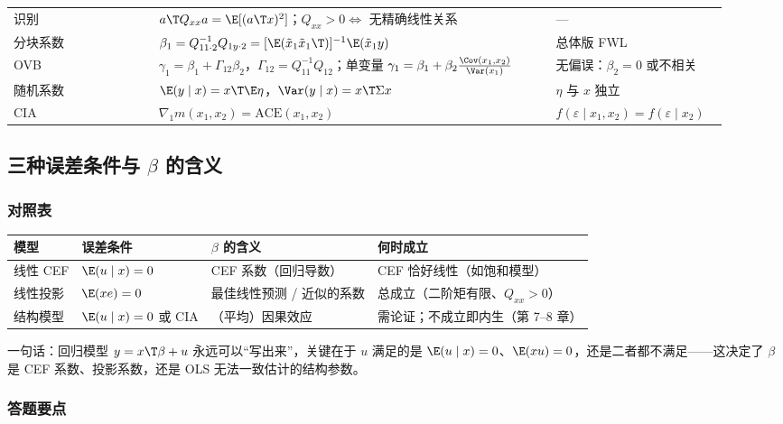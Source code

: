 {\begin{longtable}{>{\raggedright\arraybackslash}p{0.19\linewidth}>{\raggedright\arraybackslash}p{0.52\linewidth}>{\raggedright\arraybackslash}p{0.21\linewidth}}
识别 & $a\T Q_{xx}a=\E[(a\T x)^2]$；$Q_{xx}>0\iff$ 无精确线性关系 & ---\\
分块系数 & $\beta_1=Q_{11\cdot2}^{-1}Q_{1y\cdot2}=[\E(\tilde x_1\tilde x_1\T)]^{-1}\E(\tilde x_1y)$ & 总体版 FWL\\
OVB & $\gamma_1=\beta_1+\Gamma_{12}\beta_2$，$\Gamma_{12}=Q_{11}^{-1}Q_{12}$；单变量 $\gamma_1=\beta_1+\beta_2\frac{\Cov(x_1,x_2)}{\Var(x_1)}$ & 无偏误：$\beta_2=0$ 或不相关\\
随机系数 & $\E(y\mid x)=x\T\E\eta$，$\Var(y\mid x)=x\T\Sigma x$ & $\eta$ 与 $x$ 独立\\
CIA & $\nabla_1m(x_1,x_2)=\mathrm{ACE}(x_1,x_2)$ & $f(\varepsilon\mid x_1,x_2)=f(\varepsilon\mid x_2)$\\
\end{longtable}
}

\subsection{三种误差条件与 \texorpdfstring{$\beta$}{beta} 的含义}

\subsubsection{对照表}

\begin{center}
\small
\begin{tabularx}{\linewidth}{lllL}
\toprule
模型 & 误差条件 & $\beta$ 的含义 & 何时成立\\
\midrule
线性 CEF & $\E(u\mid x)=0$ & CEF 系数（回归导数） & CEF 恰好线性（如饱和模型）\\
线性投影 & $\E(xe)=0$ & 最佳线性预测 / 近似的系数 & 总成立（二阶矩有限、$Q_{xx}>0$）\\
结构模型 & $\E(u\mid x)=0$ 或 CIA & （平均）因果效应 & 需论证；不成立即内生（第 7--8 章）\\
\bottomrule
\end{tabularx}
\end{center}

一句话：回归模型 $y=x\T\beta+u$ 永远可以“写出来”，关键在于 $u$ 满足的是 $\E(u\mid x)=0$、$\E(xu)=0$，还是二者都不满足——这决定了 $\beta$ 是 CEF 系数、投影系数，还是 OLS 无法一致估计的结构参数。

\subsubsection{答题要点}

